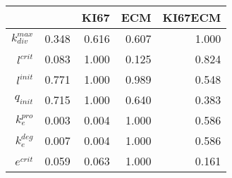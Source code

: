 \begin{tabular}{r| r r r r }
& &KI67 &ECM &KI67ECM \\
\hline 
$k_{div}^{max}$& 0.348 & 0.616 & 0.607 & 1.000 \\
$l^{crit}$& 0.083 & 1.000 & 0.125 & 0.824 \\
$l^{init}$& 0.771 & 1.000 & 0.989 & 0.548 \\
$q_{init}$& 0.715 & 1.000 & 0.640 & 0.383 \\
$k_{e}^{pro}$& 0.003 & 0.004 & 1.000 & 0.586 \\
$k_{e}^{deg}$& 0.007 & 0.004 & 1.000 & 0.586 \\
$e^{crit}$& 0.059 & 0.063 & 1.000 & 0.161 \\
\end{tabular}

